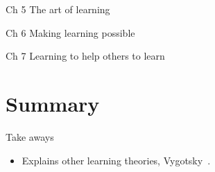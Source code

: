 \begin{frame}
  \begin{block}{Ch 5 The art of learning}
  \end{block}
\end{frame}

\begin{frame}
  \begin{block}{Ch 6 Making learning possible}
  \end{block}
\end{frame}

\begin{frame}
  \begin{block}{Ch 7 Learning to help others to learn}
  \end{block}
\end{frame}

\section{Summary}

\begin{frame}
  \begin{block}{Take aways}
    \begin{itemize}
      \item Explains other learning theories, \eg Vygotsky~\cite{Vygotsky}.
    \end{itemize}
  \end{block}
\end{frame}
